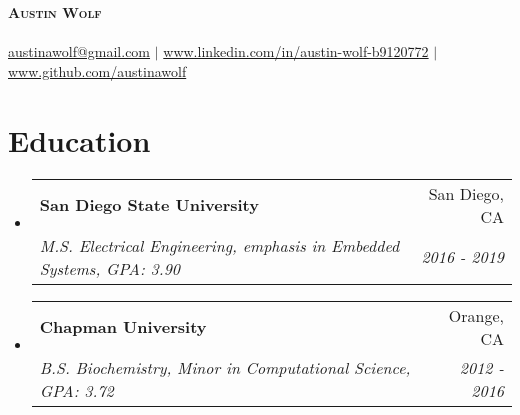 \documentclass[letterpaper,10pt]{article}
\makeatletter
\newcommand{\resumeSubheading}[4]{
  \vspace{-2pt}\item
    \begin{tabular*}{0.97\textwidth}[t]{l@{\extracolsep{\fill}}r}
      \textbf{#1} & #2 \\
      \textit{\small#3} & \textit{\small #4} \\
    \end{tabular*}\vspace{-7pt}
}
\newcommand{\resumeSubHeadingListStart}{\begin{itemize}[leftmargin=0.15in, label={}]}
\newcommand{\resumeSubHeadingListEnd}{\end{itemize}}
\makeatother
\begin{document}
\begin{center}
    \textbf{\Huge \scshape Austin Wolf} \\ \vspace{1pt}
    \small \textit{} \\
    \href{mailto:austinawolf@gmail.com}{austinawolf@gmail.com} $|$ 
    \href{https://www.linkedin.com/in/austin-wolf-b9120772/}{www.linkedin.com/in/austin-wolf-b9120772} $|$
    \href{https://github.com/austinawolf}{www.github.com/austinawolf}
\end{center}

\section{Education}
  \resumeSubHeadingListStart
    \resumeSubheading
      {San Diego State University}{San Diego, CA}
      {M.S. Electrical Engineering, emphasis in Embedded Systems, GPA: 3.90 }{2016 - 2019}
    \resumeSubheading
      {Chapman University}{Orange, CA}
      {B.S. Biochemistry, Minor in Computational Science, GPA: 3.72}{2012 - 2016}
  \resumeSubHeadingListEnd

\end{document}
